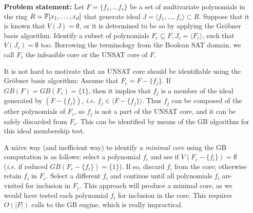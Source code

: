 \textbf{Problem statement: }
Let $F = \{f_1, \dots f_s\}$ be a set of multivariate polynomials in
the ring $R = {\mathbb{F}}[x_1,\dots,x_d]$ that generate ideal $J = \langle
f_1,\dots,f_s\rangle \subset R$. Suppose that it is known that $V(J) =
\emptyset$, or it is determined to be so by applying the Gr\"obner
basis algorithm. Identify a subset of polynomials $F_c \subseteq F,
J_c = \langle F_c \rangle$, such that $V(J_c) = \emptyset$
too. Borrowing the terminology from the Boolean SAT domain, we
call $F_c$ the infeasible core or the UNSAT core of $F$. 


It is not hard to motivate that an UNSAT core should be identifiable
using the Gr\"obner basis algorithm: Assume that $F_c=F-\{f_j\}$. If
$GB(F) = GB(F_c) = \{1\}$, then it implies that $f_j$ is a member of
the ideal generated by $(F - \{f_j\})$, {\it i.e.} $f_j \in \langle F -
\{f_j\}\rangle$. Thus $f_j$ can be composed of the other
polynomials of $F_c$, so $f_j$ is  not a part of the UNSAT core, and
it can be safely discarded from $F_c$. This can be identified by means
of the GB algorithm for this ideal membership test.%

A n\"aive way (and inefficient way) to identify {\it a minimal core}
using the GB computation is as follows:
select a polynomial $f_i$ and see if $V(F_c - \{f_i\}) = \emptyset$
({\it i.e.} if reduced $GB(F_c - \{f_i\}) = \{1\}$). If so, discard $f_i$
from the core; otherwise retain $f_i$ in $F_c$. Select a different
$f_i$ and continue until all polynomials $f_i$ are visited for
inclusion in $F_c$. This approach will produce a minimal core, as we
would have tested each polynomial $f_i$ for inclusion in the
core. This requires $O(|F|)$ calls to the GB engine, which is really
impractical.   


